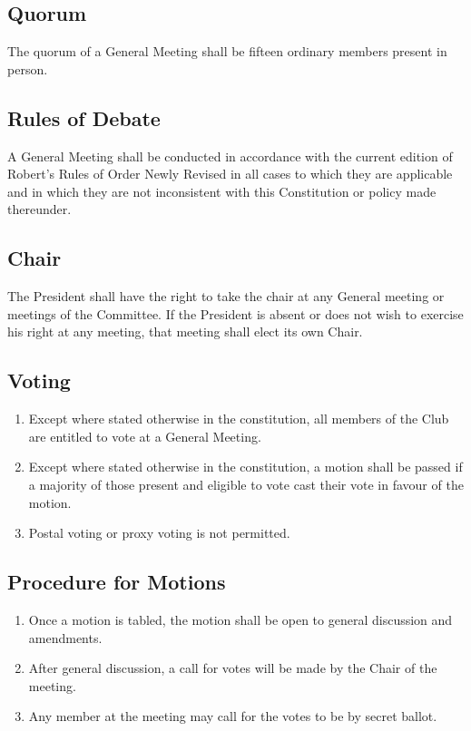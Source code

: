 \documentclass[11pt]{article} %
\begin{document}
\subsection{Quorum}
The quorum of a General Meeting shall be fifteen ordinary members present in person.

\subsection{Rules of Debate}
A General Meeting shall be conducted in accordance with the current edition of Robert’s Rules of Order Newly Revised in all cases to which they are applicable and in which they are not inconsistent with this Constitution or policy made thereunder.

\subsection{Chair}
The President shall have the right to take the chair at any General meeting or meetings of the Committee. If the President is absent or does not wish to exercise his right at any meeting, that meeting shall elect its own Chair.

\subsection{Voting}
\begin{enumerate}
	\item Except where stated otherwise in the constitution, all members of the Club are entitled to vote at a General Meeting.
	\item Except where stated otherwise in the constitution, a motion shall be passed if a majority of those present and eligible to vote cast their vote in favour of the motion.
	\item Postal voting or proxy voting is not permitted.
\end{enumerate}

\subsection{Procedure for Motions}
\begin{enumerate}
	\item Once a motion is tabled, the motion shall be open to general discussion and amendments.
	\item After general discussion, a call for votes will be made by the Chair of the meeting.
	\item Any member at the meeting may call for the votes to be by secret ballot.
\end{enumerate}
\end{document}
